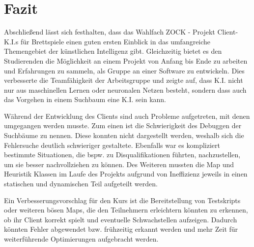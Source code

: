 \documentclass[12pt,a4paper,bibliography=totocnumbered,listof=totocnumbered]{article}
\begin{document}
\section{Fazit}
Abschließend lässt sich festhalten, dass das Wahlfach \glqq ZOCK - Projekt Client-K.I.s für Brettspiele\grqq{} einen guten ersten Einblick in das umfangreiche Themengebiet der künstlichen Intelligenz gibt. Gleichzeitig bietet es den Studierenden die Möglichkeit an einem Projekt von Anfang bis Ende zu arbeiten und Erfahrungen zu sammeln, als Gruppe an einer Software zu entwickeln. Dies verbesserte die Teamfähigkeit der Arbeitsgruppe und zeigte auf, dass K.I. nicht nur aus maschinellen Lernen oder neuronalen Netzen besteht, sondern dass auch das Vorgehen in einem Suchbaum eine K.I. sein kann.

Während der Entwicklung des Clients sind auch Probleme aufgetreten, mit denen umgegangen werden musste. Zum einen ist die Schwierigkeit des Debuggen der Suchbäume zu nennen. Diese konnten nicht dargestellt werden, weshalb sich die Fehlersuche deutlich schwieriger gestaltete. Ebenfalls war es kompliziert bestimmte Situationen, die bspw. zu Disqualifikationen führten, nachzustellen, um sie besser nachvollziehen zu können. Des Weiteren mussten die Map und Heuristik Klassen im Laufe des Projekts aufgrund von Ineffizienz jeweils in einen statischen und dynamischen Teil aufgeteilt werden.

Ein Verbesserungsvorschlag für den Kurs ist die Bereitstellung von Testskripts oder weiteren \glqq bösen\grqq{} Maps, die den Teilnehmern erleichtern könnten zu erkennen, ob ihr Client korrekt spielt und eventuelle Schwachstellen aufzeigen. Dadurch könnten Fehler abgewendet bzw. frühzeitig erkannt werden und mehr Zeit für weiterführende Optimierungen aufgebracht werden.

\newpage
\renewcommand\refname{Quellenverzeichnis}


\pagebreak
\end{document}
